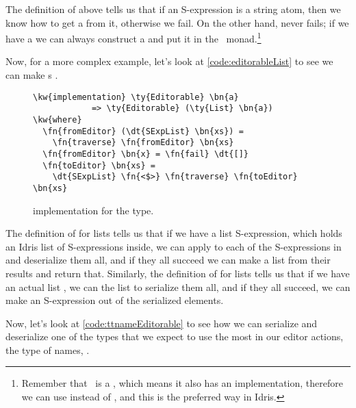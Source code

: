 The definition of  above tells us that if an S-expression is a
string atom, then we know how to get a  from it, otherwise we fail.
On the other hand,  never fails; if we have a  we can
always construct a  and put it in the
\Elab\ monad.\footnote{Remember that \Editorable\ is a , which means
it also has an  implementation, therefore we can use 
instead of , and this is the preferred way in Idris.}

Now, for a more complex example, let's look at \autoref{code:editorableList} to
see we can make s .

\begin{figure}[ht]
\begin{Verbatim}[framesep=2mm, label=\footnotesize{\normalfont{Idris}}, labelposition=topline]
\kw{implementation} \ty{Editorable} \bn{a}
            => \ty{Editorable} (\ty{List} \bn{a}) \kw{where}
  \fn{fromEditor} (\dt{SExpList} \bn{xs}) =
    \fn{traverse} \fn{fromEditor} \bn{xs}
  \fn{fromEditor} \bn{x} = \fn{fail} \dt{[]}
  \fn{toEditor} \bn{xs} =
    \dt{SExpList} \fn{<$>} \fn{traverse} \fn{toEditor} \bn{xs}
\end{Verbatim}
\caption{ implementation for the  type.}
\label{code:editorableList}
\end{figure}

The definition of  for lists tells us that if we have a list
S-expression, which holds an Idris list  of
S-expressions inside, we can apply  to each of the S-expressions
in  and deserialize them all, and if they all succeed we can make a list
from their results and return that.
Similarly, the definition of  for lists tells us that if we have an
actual list , we can  the list to serialize them all, and
if they all succeed, we can make an S-expression out of the serialized
elements.

Now, let's look at \autoref{code:ttnameEditorable} to see how we can serialize and
deserialize one of the types that we expect to use the most in our editor
actions, the type of names, .


